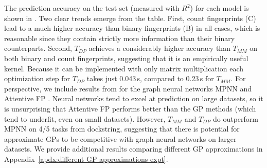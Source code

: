 \documentclass{article}
\theoremstyle{plain}
\theoremstyle{definition}
\theoremstyle{remark}
\begin{document}
The prediction accuracy on the test set (measured with $R^2$) for each model is shown in .
Two clear trends emerge from the table.
First, count fingerprints (C) lead to a much higher accuracy than binary fingerprints (B)
in all cases, which is reasonable since they contain strictly more information than their binary counterparts.
Second, $T_{DP}$ achieves a considerably higher accuracy than $T_{MM}$ on both binary and count fingerprints,
suggesting that it is an empirically useful kernel.
Because it can be implemented with only matrix multiplication each optimization step 
for $T_{DP}$ takes just 0.043\,s, compared to 0.23\,s for $T_{MM}$.
For perspective, we include results from \citet{garcia2022dockstring} 
for the graph neural networks MPNN \citep{gilmer2017neural} and Attentive FP \citep{xiong2019pushing}.
Neural networks tend to excel at prediction on large datasets,
so it is unsurprising that Attentive FP performs better than the GP methods
(which tend to underfit, even on small datasets).
However, $T_{MM}$ and $T_{DP}$ do outperform MPNN on 4/5 tasks from dockstring,
suggesting that there is potential for approximate GPs to be competitive with graph neural networks on larger datasets.
We provide additional results comparing different GP approximations in Appendix~\ref{apdx:different GP approximations expt}.
\end{document}
